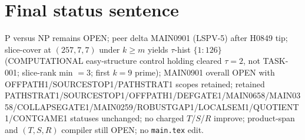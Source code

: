 \documentclass[11pt]{article}
\begin{document}
\section*{Final status sentence}
P versus NP remains OPEN; peer delta MAIN0901 (LSPV-5) after H0849 tip; slice-cover at $(257,7,7)$ under $k{\ge}m$ yields $\tau$-hist $\{1{:}126\}$ (COMPUTATIONAL easy-structure control holding cleared $\tau{=}2$, not TASK-001; slice-rank min $=3$; first $k{=}9$ prime); MAIN0901 overall OPEN with OFFPATH1/SOURCESTOP1/PATHSTRAT1 scopes retained; retained PATHSTRAT1/SOURCESTOP1/OFFPATH1/DEFGATE1/MAIN0658/MAIN0358/COLLAPSEGATE1/MAIN0259/ROBUSTGAP1/LOCALSEM1/QUOTIENT1/CONTGAME1 statuses unchanged; no charged $T$/$S$/$R$ improve; product-span and $(T,S,R)$ compiler still OPEN; no \texttt{main.tex} edit.
\end{document}
